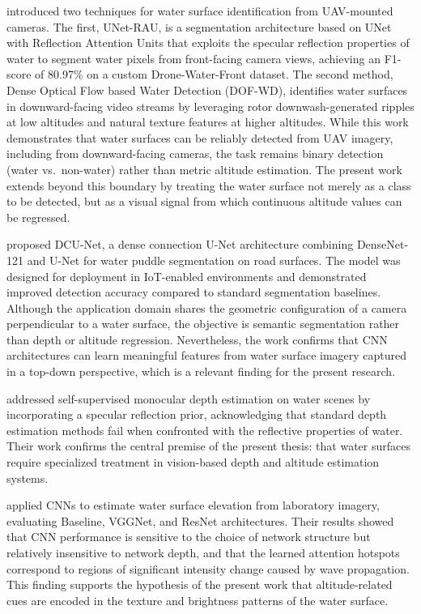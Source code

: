     \cite{SAMARANAYAKE2023103933} introduced two techniques for water surface identification from UAV-mounted cameras.
    The first, UNet-RAU, is a segmentation architecture based on UNet with Reflection Attention Units that exploits the specular reflection properties of water to segment water pixels from front-facing camera views, achieving an F1-score of 80.97\% on a custom Drone-Water-Front dataset.
    The second method, Dense Optical Flow based Water Detection (DOF-WD), identifies water surfaces in downward-facing video streams by leveraging rotor downwash-generated ripples at low altitudes and natural texture features at higher altitudes.
    While this work demonstrates that water surfaces can be reliably detected from UAV imagery, including from downward-facing cameras, the task remains binary detection (water vs.\ non-water) rather than metric altitude estimation.
    The present work extends beyond this boundary by treating the water surface not merely as a class to be detected, but as a visual signal from which continuous altitude values can be regressed.

    \cite{ChangXu2024DCUNet} proposed DCU-Net, a dense connection U-Net architecture combining DenseNet-121 and U-Net for water puddle segmentation on road surfaces.
    The model was designed for deployment in IoT-enabled environments and demonstrated improved detection accuracy compared to standard segmentation baselines.
    Although the application domain shares the geometric configuration of a camera perpendicular to a water surface, the objective is semantic segmentation rather than depth or altitude regression.
    Nevertheless, the work confirms that CNN architectures can learn meaningful features from water surface imagery captured in a top-down perspective, which is a relevant finding for the present research.

    \cite{WaterDepthSpecular} addressed self-supervised monocular depth estimation on water scenes by incorporating a specular reflection prior, acknowledging that standard depth estimation methods fail when confronted with the reflective properties of water.
    Their work confirms the central premise of the present thesis: that water surfaces require specialized treatment in vision-based depth and altitude estimation systems.

    \cite{CHEN2022110819} applied CNNs to estimate water surface elevation from laboratory imagery, evaluating Baseline, VGGNet, and ResNet architectures.
    Their results showed that CNN performance is sensitive to the choice of network structure but relatively insensitive to network depth, and that the learned attention hotspots correspond to regions of significant intensity change caused by wave propagation.
    This finding supports the hypothesis of the present work that altitude-related cues are encoded in the texture and brightness patterns of the water surface.

